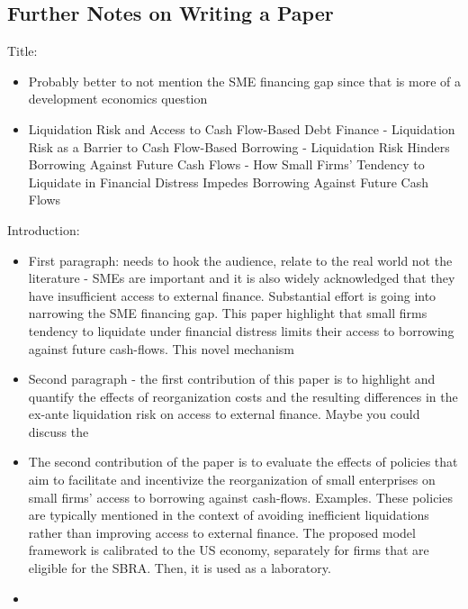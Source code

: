 \documentclass[12pt]{article}
\begin{document}
\subsection*{Further Notes on Writing a Paper} 
Title:
\begin{itemize} \small
    \item Probably better to not mention the SME financing gap since that is more of a development economics question
    \item Liquidation Risk and Access to Cash Flow-Based Debt Finance - Liquidation Risk as a Barrier to Cash Flow-Based Borrowing - Liquidation Risk Hinders Borrowing Against Future Cash Flows - How Small Firms' Tendency to Liquidate in Financial Distress Impedes Borrowing Against Future Cash Flows
\end{itemize} \normalsize
Introduction:
\begin{itemize} \small
    \item First paragraph: needs to hook the audience, relate to the real world not the literature - SMEs are important and it is also widely acknowledged that they have insufficient access to external finance. Substantial effort is going into narrowing the SME financing gap. This paper highlight that small firms tendency to liquidate under financial distress limits their access to borrowing against future cash-flows. This novel mechanism 
    \item Second paragraph - the first contribution of this paper is to highlight and quantify the effects of reorganization costs and the resulting differences in the ex-ante liquidation risk on access to external finance. Maybe you could discuss the 
    \item The second contribution of the paper is to evaluate the effects of policies that aim to facilitate and incentivize the reorganization of small enterprises on small firms' access to borrowing against cash-flows. Examples. These policies are typically mentioned in the context of avoiding inefficient liquidations rather than improving access to external finance.  The proposed model framework is calibrated to the US economy, separately for firms that are eligible for the SBRA. Then, it is used as a laboratory. 
    \item 
\end{itemize} \normalsize
\end{document}
